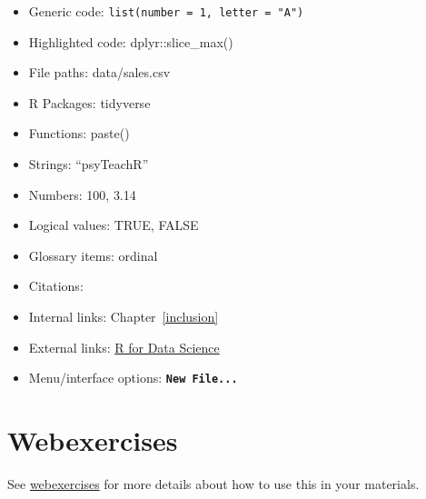 \documentclass[
  oneside]{book}
\providecommand{\tightlist}{%
  \setlength{\itemsep}{0pt}\setlength{\parskip}{0pt}}
\begin{document}
\begin{itemize}
\tightlist
\item
  Generic code: \texttt{list(number\ =\ 1,\ letter\ =\ "A")}
\item
  Highlighted code: {{dplyr}{::}{slice\_max}{(}{)}}
\item
  File paths: data/sales.csv
\item
  R Packages: tidyverse
\item
  Functions: {{paste}{(}{)}}
\item
  Strings: {{``psyTeachR''}}
\item
  Numbers: {{100}}, {{3.14}}
\item
  Logical values: {{TRUE}}, {{FALSE}}
\item
  Glossary items: ordinal{}
\item
  Citations: \citet{R-tidyverse}
\item
  Internal links: Chapter~\ref{inclusion}
\item
  External links: \href{https://r4ds.had.co.nz/}{R for Data Science}
\item
  Menu/interface options: \textbf{\texttt{New\ File...}}
\end{itemize}

\hypertarget{webexercises}{%
\section{Webexercises}\label{webexercises}}

See \href{https://psyteachr.github.io/webexercises/}{webexercises} for more details about how to use this in your materials.
\end{document}
